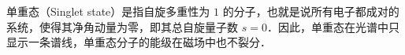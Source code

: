 
单重态（Singlet state）是指自旋多重性为 $1$ 的分子，也就是说所有电子都成对的系统，使得其净角动量为零，即其总自旋量子数 $s=0$．因此，单重态在光谱中只显示一条谱线，单重态分子的能级在磁场中也不裂分．